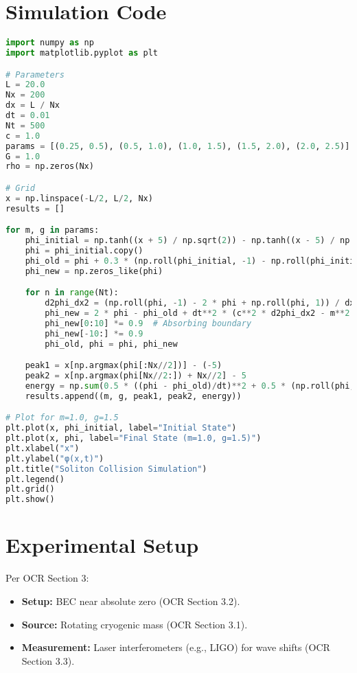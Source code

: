 \documentclass{article}
\begin{document}
\section{Simulation Code}
\begin{lstlisting}[language=Python, caption=Soliton Collision Simulation, label=lst:soliton]
import numpy as np
import matplotlib.pyplot as plt

# Parameters
L = 20.0
Nx = 200
dx = L / Nx
dt = 0.01
Nt = 500
c = 1.0
params = [(0.25, 0.5), (0.5, 1.0), (1.0, 1.5), (1.5, 2.0), (2.0, 2.5)]
G = 1.0
rho = np.zeros(Nx)

# Grid
x = np.linspace(-L/2, L/2, Nx)
results = []

for m, g in params:
    phi_initial = np.tanh((x + 5) / np.sqrt(2)) - np.tanh((x - 5) / np.sqrt(2))
    phi = phi_initial.copy()
    phi_old = phi + 0.3 * (np.roll(phi_initial, -1) - np.roll(phi_initial, 1)) / (2 * dx) * dt
    phi_new = np.zeros_like(phi)

    for n in range(Nt):
        d2phi_dx2 = (np.roll(phi, -1) - 2 * phi + np.roll(phi, 1)) / dx**2  # Periodic base
        phi_new = 2 * phi - phi_old + dt**2 * (c**2 * d2phi_dx2 - m**2 * phi - g * phi**3 + 8 * np.pi * G * rho)
        phi_new[0:10] *= 0.9  # Absorbing boundary
        phi_new[-10:] *= 0.9
        phi_old, phi = phi, phi_new

    peak1 = x[np.argmax(phi[:Nx//2])] - (-5)
    peak2 = x[np.argmax(phi[Nx//2:]) + Nx//2] - 5
    energy = np.sum(0.5 * ((phi - phi_old)/dt)**2 + 0.5 * (np.roll(phi, -1) - phi)/dx**2 + 0.5 * m**2 * phi**2 + 0.25 * g * phi**4)
    results.append((m, g, peak1, peak2, energy))

# Plot for m=1.0, g=1.5
plt.plot(x, phi_initial, label="Initial State")
plt.plot(x, phi, label="Final State (m=1.0, g=1.5)")
plt.xlabel("x")
plt.ylabel("φ(x,t)")
plt.title("Soliton Collision Simulation")
plt.legend()
plt.grid()
plt.show()
\end{lstlisting}

\section{Experimental Setup}
Per OCR Section 3:
\begin{itemize}
    \item \textbf{Setup:} BEC near absolute zero (OCR Section 3.2).
    \item \textbf{Source:} Rotating cryogenic mass (OCR Section 3.1).
    \item \textbf{Measurement:} Laser interferometers (e.g., LIGO) for wave shifts (OCR Section 3.3).
\end{itemize}
\end{document}
